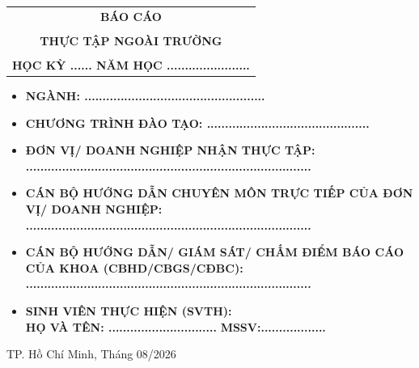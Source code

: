 \documentclass[a4paper]{article}
\theoremstyle{definition}
\begin{document}
\begin{titlepage}
\begin{center}
\begin{tabular}{c}
\multicolumn{1}{c}{\textbf{{\LARGE BÁO CÁO}}}\\
\\{\textbf{{\LARGE THỰC TẬP NGOÀI TRƯỜNG}}}
\\
\\
\textbf{\Large HỌC KỲ ...... NĂM HỌC .......................} \\
\end{tabular}
\end{center}
\vspace{0.5cm}
\begin{itemize}
\renewcommand\labelitemi{--}
    \item \Large \textbf{NGÀNH: ..................................................}
    \item \Large \textbf{CHƯƠNG TRÌNH ĐÀO TẠO: .............................................}
\end{itemize}
\vspace{0.7cm}
\begin{itemize}
\renewcommand\labelitemi{--}
    \item \Large \textbf{ĐƠN VỊ/ DOANH NGHIỆP NHẬN THỰC TẬP:}
    \\ \Large \textbf{...............................................................................}
    \item \Large \textbf{CÁN BỘ HƯỚNG DẪN CHUYÊN MÔN TRỰC TIẾP CỦA ĐƠN VỊ/ DOANH NGHIỆP:}
    \\ \Large \textbf{...............................................................................}
    \item \Large \textbf{CÁN BỘ HƯỚNG DẪN/ GIÁM SÁT/ CHẤM ĐIỂM BÁO CÁO CỦA KHOA (CBHD/CBGS/CĐBC):}
    \\ \Large \textbf{...............................................................................}
    \item \Large \textbf{SINH VIÊN THỰC HIỆN (SVTH):}
    \\ \Large \textbf{HỌ VÀ TÊN: ..............................} \textbf{MSSV:..................}
\end{itemize}
\vspace{0.5cm}
\begin{center}
{\Large TP. Hồ Chí Minh, Tháng 08/2026}
\end{center}
\end{titlepage}

\newpage
\tableofcontents
\newpage
\end{document}
